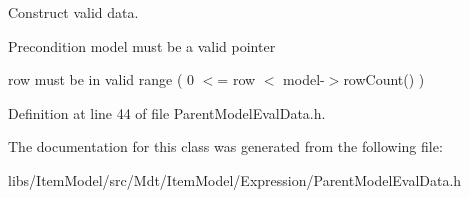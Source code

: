 Construct valid data. 

\begin{DoxyPrecond}{Precondition}
model must be a valid pointer 

row must be in valid range ( 0 $<$= row $<$ model-\/$>$row\+Count() ) 
\end{DoxyPrecond}


Definition at line 44 of file Parent\+Model\+Eval\+Data.\+h.



The documentation for this class was generated from the following file\+:\begin{DoxyCompactItemize}
\item 
libs/\+Item\+Model/src/\+Mdt/\+Item\+Model/\+Expression/Parent\+Model\+Eval\+Data.\+h\end{DoxyCompactItemize}
